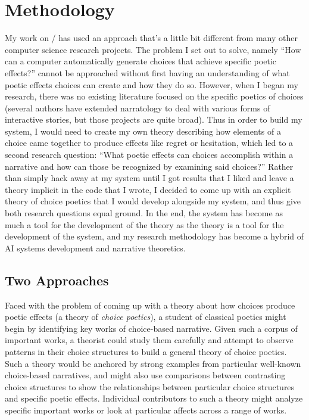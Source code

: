 \chapter{Methodology}

\label{ch:method}

My work on \dunyazad/ has used an approach that's a little bit different from many other computer science research projects.
%
The problem I set out to solve, namely ``How can a computer automatically generate choices that achieve specific poetic effects?'' cannot be approached without first having an understanding of what poetic effects choices can create and how they do so.
%
However, when I began my research, there was no existing literature focused on the specific poetics of choices (several authors have extended narratology to deal with various forms of interactive stories, but those projects are quite broad).
%
Thus in order to build my system, I would need to create my own theory describing how elements of a choice came together to produce effects like regret or hesitation, which led to a second research question: ``What poetic effects can choices accomplish within a narrative and how can those be recognized by examining said choices?''
%
Rather than simply hack away at my system until I got results that I liked and leave a theory implicit in the code that I wrote, I decided to come up with an explicit theory of choice poetics that I would develop alongside my system, and thus give both research questions equal ground.
%
In the end, the system has become as much a tool for the development of the theory as the theory is a tool for the development of the system, and my research methodology has become a hybrid of AI systems development and narrative theoretics.


\section{Two Approaches}

Faced with the problem of coming up with a theory about how choices produce poetic effects (a theory of \emph{choice poetics}), a student of classical poetics might begin by identifying key works of choice-based narrative.
%
Given such a corpus of important works, a theorist could study them carefully and attempt to observe patterns in their choice structures to build a general theory of choice poetics.
%
Such a theory would be anchored by strong examples from particular well-known choice-based narratives, and might also use comparisons between contrasting choice structures to show the relationships between particular choice structures and specific poetic effects.
%
Individual contributors to such a theory might analyze specific important works or look at particular affects across a range of works.


